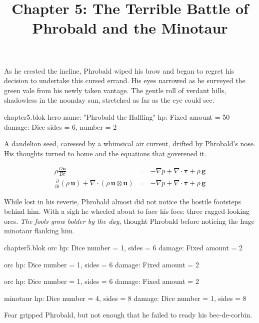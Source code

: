 

\title{Chapter 5: The Terrible Battle of Phrobald and the Minotaur}

\begin{code}{chapter5.blok}
battle {
\end{code}

As he crested the incline, Phrobald wiped his brow and began to
regret his decision to undertake this cursed errand.  His eyes
narrowed as he surveyed the green vale from his newly taken
vantage.  The gentle roll of verdant hills, shadowless in
the noonday sun, stretched as far as the eye could see.

\begin{code}{chapter5.blok}
  hero {
    name: "Phrobald the Halfling"
    hp: Fixed { amount = 50 }
    damage: Dice { sides = 6, number = 2 }
  }
\end{code}

A dandelion seed, caressed by a whimsical air current,
drifted by Phrobald's nose.  His thoughts turned to home and
the equations that goverened it.

\begin{eqnarray}
  \rho\frac{D\mathbf{u}}{Dt} & = & - \nabla p + \nabla \cdot \boldsymbol \tau + \rho\,\mathbf{g} \\
  \frac {\partial}{\partial t} (\rho\,\mathbf{u})
   + \nabla \cdot (\rho\,\mathbf{u} \otimes \mathbf{u})
 & = & - \nabla p + \nabla \cdot \boldsymbol \tau + \rho\,\mathbf{g}
\end{eqnarray}

While lost in his reverie, Phrobald almost did not notice
the hostile footsteps behind him.  With a sigh he wheeled about to
face his foes: three ragged-looking orcs.
\textit{The fools grow bolder by the day,} thought Phrobald
before noticing the huge minotaur flanking him.

\begin{code}{chapter5.blok}
  orc {
    hp: Dice { number = 1, sides = 6 }
    damage: Fixed { amount = 2 }
  }

  orc {
    hp: Dice { number = 1, sides = 6 }
    damage: Fixed { amount = 2 }
  }

  orc {
    hp: Dice { number = 1, sides = 6 }
    damage: Fixed { amount = 2 }
  }

  minotaur {
    hp: Dice { number = 4, sides = 8 }
    damage: Dice { number = 1, sides = 8}
  }
\end{code}

Fear gripped Phrobald, but not enough that he failed to ready
his bec-de-corbin.

\begin{code}{chapter5.blok}
}
\end{code}

